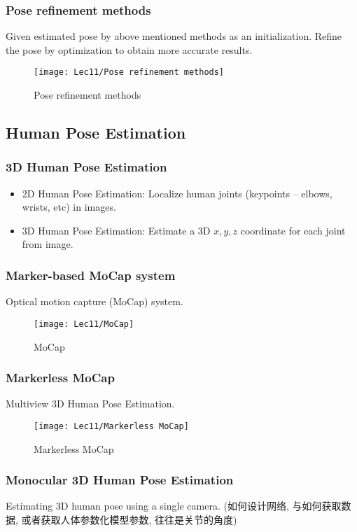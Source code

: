 \subsubsection{Pose refinement methods}

Given estimated pose by above mentioned methods as an initialization. Refine the pose by optimization to obtain more accurate results.

\begin{figure}[H]
    \centering
    \texttt{[image: Lec11/Pose refinement methods]}
    \caption{Pose refinement methods}
\end{figure}

\subsection{Human Pose Estimation}
\subsubsection{3D Human Pose Estimation}
\begin{itemize}
    \item 2D Human Pose Estimation: Localize human joints (keypoints – elbows, wrists, etc) in images.
    \item 3D Human Pose Estimation: Estimate a 3D $x, y, z$ coordinate for each joint from image. 
\end{itemize}

\subsubsection{Marker-based MoCap system}
Optical motion capture (MoCap) system. 

\begin{figure}[H]
    \centering
    \texttt{[image: Lec11/MoCap]}
    \caption{MoCap}
\end{figure}

\subsubsection{Markerless MoCap}
Multiview 3D Human Pose Estimation.
\begin{figure}[H]
    \centering
    \texttt{[image: Lec11/Markerless MoCap]}
    \caption{Markerless MoCap}
\end{figure}

\subsubsection{Monocular 3D Human Pose Estimation}
Estimating 3D human pose using a single camera. (如何设计网络, 与如何获取数据, 或者获取人体参数化模型参数, 往往是关节的角度)

